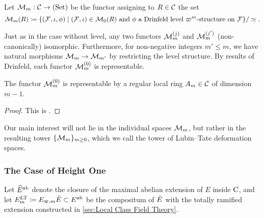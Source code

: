 \documentclass[../main.tex]{subfiles}
\begin{document}
\begin{defi}\label{def:LTDefSpaceWithLevel}
  Let $\mathcal{M}_m: \mathcal{C} \to {(\mathrm{Set})}$ be the functor assigning to $R \in \mathcal{C}$ the set 
  \begin{equation*}
    \mathcal{M}_m(R) \coloneqq \{(\mathcal{F}, \iota, \phi) \mid (\mathcal{F}, \iota) \in \mathcal{M}_0(R) \text{ and }\phi
    \text{ a Drinfeld level $\varpi^m$-structure on $\mathcal{F}$}\}/\simeq.
  \end{equation*}
\end{defi}

Just as in the case without level, any two functors $\mathcal{M}_m^{(j)}$ and
$\mathcal{M}_m^{(j')}$ (non-canonically) isomorphic.
Furthermore, for non-negative integers $m' \leq m$, we have
natural morphisms
$\mathcal{M}_m \to \mathcal{M}_{m'}$ by restricting the level structure. 
By results of Drinfeld, each functor $\mathcal{M}_m^{(0)}$ is representable.

\begin{thm}\label{thm:RepresentabilityOfDefSpaceWithLevel}
  The functor $\mathcal{M}_m^{(0)}$ is representable by a regular local ring $A_m \in \mathcal{C}$ of 
  dimension $m-1$.
\begin{proof}
  This is \cite[Proposition 4.3]{drinfel1974elliptic}.
\end{proof}
\end{thm}

Our main interest will
not lie in the individual spaces $\mathcal{M}_m$, but rather in the resulting tower
$\{\mathcal{M}_m\}_{m \geq 0}$, which we call the tower of Lubin--Tate deformation
spaces.


\subsubsection{The Case of Height One} %
\label{ssub:The Case of Height One}
Let $\widehat E^{\mathrm{ab}}$ denote the closure of the maximal abelian extension of $E$ inside
${\mathrm{C}}$, and let $E_m^{\mathrm{LT}} \coloneq E_{\varpi, m}{\breve {E}} \subset E^{\mathrm{ab}}$ be the compositum
of ${\breve {E}}$ with the totally ramified extension constructed in \cref{sec:Local
Class Field Theory}. 
\end{document}
